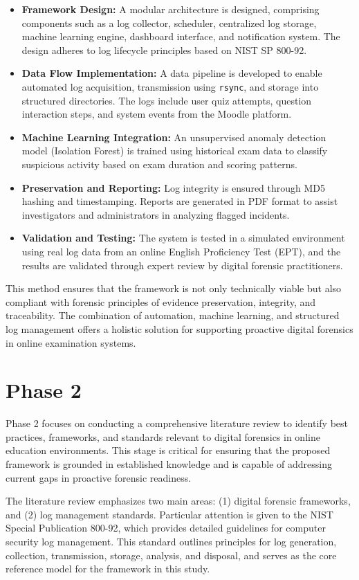 \begin{itemize}
	\item \textbf{Framework Design:} A modular architecture is designed, comprising components such as a log collector, scheduler, centralized log storage, machine learning engine, dashboard interface, and notification system. The design adheres to log lifecycle principles based on NIST SP 800-92.
	\item \textbf{Data Flow Implementation:} A data pipeline is developed to enable automated log acquisition, transmission using \texttt{rsync}, and storage into structured directories. The logs include user quiz attempts, question interaction steps, and system events from the Moodle platform.
	\item \textbf{Machine Learning Integration:} An unsupervised anomaly detection model (Isolation Forest) is trained using historical exam data to classify suspicious activity based on exam duration and scoring patterns.
	\item \textbf{Preservation and Reporting:} Log integrity is ensured through MD5 hashing and timestamping. Reports are generated in PDF format to assist investigators and administrators in analyzing flagged incidents.
	\item \textbf{Validation and Testing:} The system is tested in a simulated environment using real log data from an online English Proficiency Test (EPT), and the results are validated through expert review by digital forensic practitioners.
\end{itemize}

This method ensures that the framework is not only technically viable but also compliant with forensic principles of evidence preservation, integrity, and traceability. The combination of automation, machine learning, and structured log management offers a holistic solution for supporting proactive digital forensics in online examination systems.

\section{Phase 2}
Phase 2 focuses on conducting a comprehensive literature review to identify best practices, frameworks, and standards relevant to digital forensics in online education environments. This stage is critical for ensuring that the proposed framework is grounded in established knowledge and is capable of addressing current gaps in proactive forensic readiness.

The literature review emphasizes two main areas: (1) digital forensic frameworks, and (2) log management standards. Particular attention is given to the NIST Special Publication 800-92, which provides detailed guidelines for computer security log management. This standard outlines principles for log generation, collection, transmission, storage, analysis, and disposal, and serves as the core reference model for the framework in this study.

